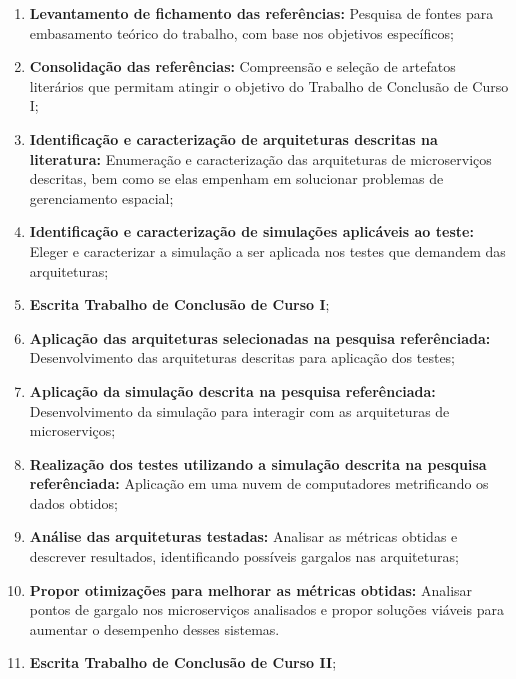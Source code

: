 \begin{enumerate}
  \item \textbf{Levantamento de fichamento das referências:} Pesquisa de fontes para embasamento teórico do trabalho, com base nos objetivos específicos;

  \item \textbf{Consolidação das referências:} Compreensão e seleção de artefatos literários que permitam atingir o objetivo do Trabalho de Conclusão de Curso I;

  \item \textbf{Identificação e caracterização de arquiteturas descritas na literatura:} Enumeração e caracterização das arquiteturas de microserviços descritas, bem como se elas empenham em solucionar problemas de gerenciamento espacial;

  \item \textbf{Identificação e caracterização de simulações aplicáveis ao teste:} Eleger e caracterizar a simulação a ser aplicada nos testes que demandem das arquiteturas;

  \item \textbf{Escrita Trabalho de Conclusão de Curso I};

  \item \textbf{Aplicação das arquiteturas selecionadas na pesquisa referênciada:} Desenvolvimento das arquiteturas descritas para aplicação dos testes;

  \item \textbf{Aplicação da simulação descrita na pesquisa referênciada:} Desenvolvimento da simulação para interagir com as arquiteturas de microserviços;

  \item \textbf{Realização dos testes utilizando a simulação descrita na pesquisa referênciada:} Aplicação em uma nuvem de computadores metrificando os dados obtidos;

  \item \textbf{Análise das arquiteturas testadas:} Analisar as métricas obtidas e descrever resultados, identificando possíveis gargalos nas arquiteturas;

  \item \textbf{Propor otimizações para melhorar as métricas obtidas:} Analisar pontos de gargalo nos microserviços analisados e propor soluções viáveis para aumentar o desempenho desses sistemas.

  \item \textbf{Escrita Trabalho de Conclusão de Curso II};
\end{enumerate}

